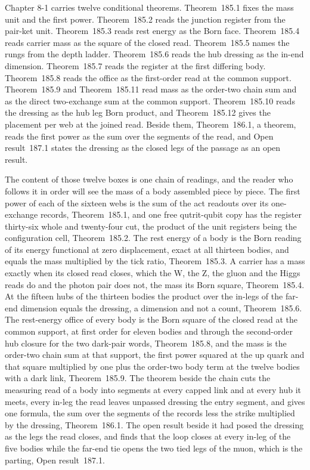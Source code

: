Chapter 8-1 carries twelve conditional theorems. Theorem~185.1 fixes the mass unit and the first power. Theorem~185.2 reads the junction register from the pair-ket unit. Theorem~185.3 reads rest energy as the Born face. Theorem~185.4 reads carrier mass as the square of the closed read. Theorem~185.5 names the rungs from the depth ladder. Theorem~185.6 reads the hub dressing as the in-end dimension. Theorem~185.7 reads the register at the first differing body. Theorem~185.8 reads the office as the first-order read at the common support. Theorem~185.9 and Theorem~185.11 read mass as the order-two chain sum and as the direct two-exchange sum at the common support. Theorem~185.10 reads the dressing as the hub leg Born product, and Theorem~185.12 gives the placement per web at the joined read. Beside them, Theorem~186.1, a theorem, reads the first power as the sum over the segments of the read, and Open result~187.1 states the dressing as the closed legs of the passage as an open result.

The content of those twelve boxes is one chain of readings, and the reader who follows it in order will see the mass of a body assembled piece by piece. The first power of each of the sixteen webs is the sum of the act readouts over its one-exchange records, Theorem~185.1, and one free qutrit-qubit copy has the register thirty-six whole and twenty-four cut, the product of the unit registers being the configuration cell, Theorem~185.2. The rest energy of a body is the Born reading of its energy functional at zero displacement, exact at all thirteen bodies, and equals the mass multiplied by the tick ratio, Theorem~185.3. A carrier has a mass exactly when its closed read closes, which the W, the Z, the gluon and the Higgs reads do and the photon pair does not, the mass its Born square, Theorem~185.4. At the fifteen hubs of the thirteen bodies the product over the in-legs of the far-end dimension equals the dressing, a dimension and not a count, Theorem~185.6. The rest-energy office of every body is the Born square of the closed read at the common support, at first order for eleven bodies and through the second-order hub closure for the two dark-pair words, Theorem~185.8, and the mass is the order-two chain sum at that support, the first power squared at the up quark and that square multiplied by one plus the order-two body term at the twelve bodies with a dark link, Theorem~185.9. The theorem beside the chain cuts the measuring read of a body into segments at every capped link and at every hub it meets, every in-leg the read leaves unpassed dressing the entry segment, and gives one formula, the sum over the segments of the records less the strike multiplied by the dressing, Theorem~186.1. The open result beside it had posed the dressing as the legs the read closes, and finds that the loop closes at every in-leg of the five bodies while the far-end tie opens the two tied legs of the muon, which is the parting, Open result~187.1.

